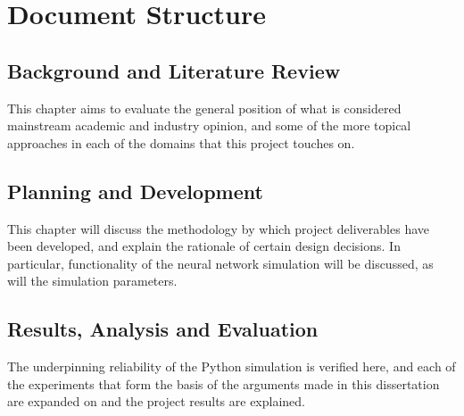 
%

\section{Document Structure}

\subsection*{Background and Literature Review}
This chapter aims to evaluate the general position of what is considered
mainstream academic and industry opinion, and some of the more topical
approaches in each of the domains that this project touches on.

\subsection*{Planning and Development}
This chapter will discuss the methodology by which project deliverables have
been developed, and explain the rationale of certain design decisions. In
particular, functionality of the neural network simulation will be discussed, as
will the simulation parameters.

\subsection*{Results, Analysis and Evaluation}
The underpinning reliability of the Python simulation is verified here, and each
of the experiments that form the basis of the arguments made in this
dissertation are expanded on and the project results are explained.

